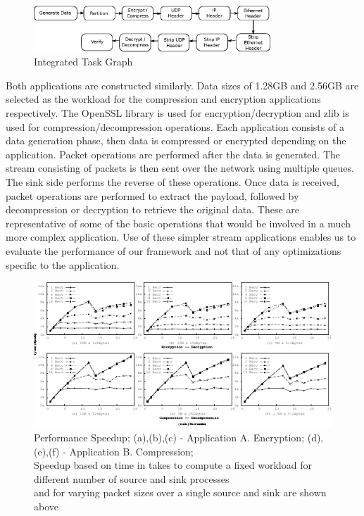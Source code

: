 \documentclass[conference]{IEEEtran}
\newcommand{\comment}[1]{}
\begin{document}
\begin{figure}[htb]
\centering
\includegraphics[width=3.5in]{enc-dec}
\caption{ Integrated Task Graph  }
\label{fig-app-graph}
\end{figure}

Both applications are constructed similarly. Data sizes of 1.28GB and 2.56GB are selected as the workload for the compression and encryption applications respectively. The OpenSSL library is used for encryption/decryption and zlib is used for compression/decompression operations. Each application consists of a data generation phase, then data is compressed or encrypted depending on the application. Packet operations are performed after the data is generated. The stream consisting of packets is then sent over the network using multiple queues. The sink side performs the reverse of these operations. Once data is received, packet operations are performed to extract the payload, followed by decompression or decryption to retrieve the original data. These are representative of some of the basic operations that would be involved in a much more complex application. \comment{Choosing to compare these simple operations avoids any extraneous factors that may be present in a more complex application.}Use of these simpler stream applications enables us to evaluate the performance of our framework and not that of any optimizations specific to the application.

\begin{figure}[tb]
\centering
\includegraphics[width=7in]{result}
\caption{Performance Speedup; (a),(b),(c) - Application A. Encryption; (d),(e),(f) - Application B. Compression;\\ \newline Speedup based on time in takes to compute a fixed workload for different number of source and sink processes\\ \newline and for varying packet sizes over a single source and sink are shown above}
\label{fig-res}
\end{figure}
\end{document}
